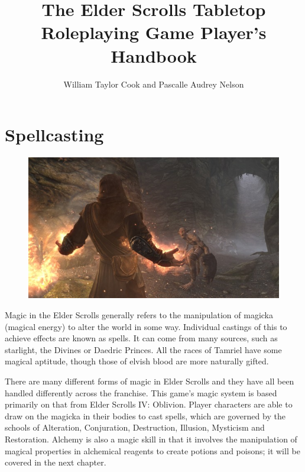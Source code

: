 \documentclass[12pt]{book}
\title{The Elder Scrolls Tabletop Roleplaying Game Player's Handbook}
\author{William Taylor Cook and Pascalle Audrey Nelson}
\begin{document}
\maketitle



\tableofcontents







\chapter{Spellcasting}

\begin{figure}
	\includegraphics[width=\textwidth]{flamespell.png}
\end{figure}

Magic in the Elder Scrolls generally refers to the manipulation of magicka (magical energy) to alter the world in some way. Individual castings of this to achieve effects are known as spells. It can come from many sources, such as starlight, the Divines or Daedric Princes. All the races of Tamriel have some magical aptitude, though those of elvish blood are more naturally gifted.

There are many different forms of magic in Elder Scrolls and they have all been handled differently across the franchise. This game's magic system is based primarily on that from Elder Scrolls IV: Oblivion. Player characters are able to draw on the magicka in their bodies to cast spells, which are governed by the schools of Alteration, Conjuration, Destruction, Illusion, Mysticism and Restoration. Alchemy is also a magic skill in that it involves the manipulation of magical properties in alchemical reagents to create potions and poisons; it will be covered in the next chapter.
\end{document}
